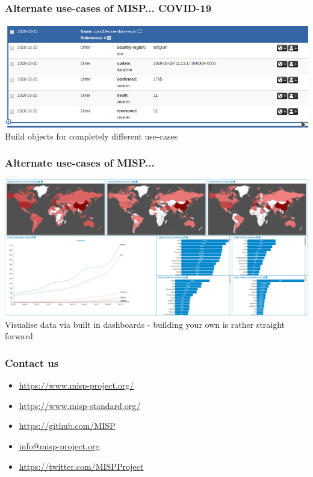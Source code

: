 \begin{frame}
    \frametitle{Alternate use-cases of MISP... COVID-19}
    \includegraphics[width=1.00\linewidth]{covidobject.png}
    Build objects for completely different use-cases
\end{frame}

\begin{frame}
    \frametitle{Alternate use-cases of MISP...}
    \includegraphics[width=1.00\linewidth]{covid.png}
    Visualise data via built in dashboards - building your own is rather straight forward
\end{frame}

\begin{frame}
  \frametitle{Contact us}
  \begin{itemize}
    \item \url{https://www.misp-project.org/}
    \item \url{https://www.misp-standard.org/}
    \item \url{https://github.com/MISP}
    \item \url{info@misp-project.org}
    \item \url{https://twitter.com/MISPProject}
  \end{itemize}
\end{frame}


